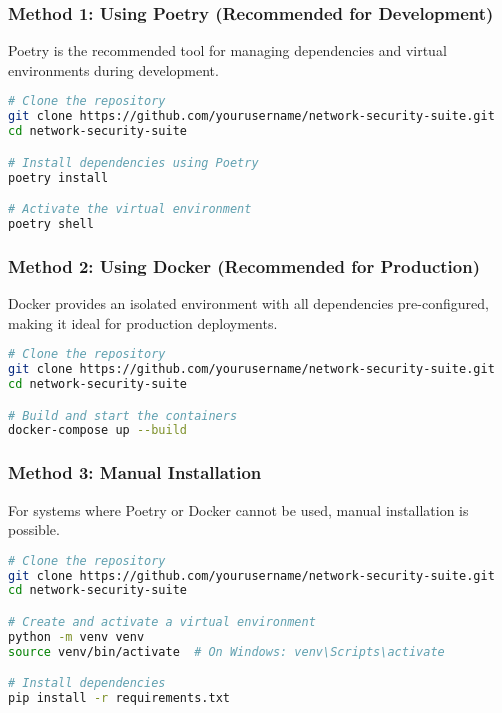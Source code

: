 \subsubsection{Method 1: Using Poetry (Recommended for Development)}
Poetry is the recommended tool for managing dependencies and virtual environments during development.

\begin{lstlisting}[language=bash, caption=Installation using Poetry]
# Clone the repository
git clone https://github.com/yourusername/network-security-suite.git
cd network-security-suite

# Install dependencies using Poetry
poetry install

# Activate the virtual environment
poetry shell
\end{lstlisting}

\subsubsection{Method 2: Using Docker (Recommended for Production)}
Docker provides an isolated environment with all dependencies pre-configured, making it ideal for production deployments.

\begin{lstlisting}[language=bash, caption=Installation using Docker]
# Clone the repository
git clone https://github.com/yourusername/network-security-suite.git
cd network-security-suite

# Build and start the containers
docker-compose up --build
\end{lstlisting}

\subsubsection{Method 3: Manual Installation}
For systems where Poetry or Docker cannot be used, manual installation is possible.

\begin{lstlisting}[language=bash, caption=Manual Installation]
# Clone the repository
git clone https://github.com/yourusername/network-security-suite.git
cd network-security-suite

# Create and activate a virtual environment
python -m venv venv
source venv/bin/activate  # On Windows: venv\Scripts\activate

# Install dependencies
pip install -r requirements.txt
\end{lstlisting}

